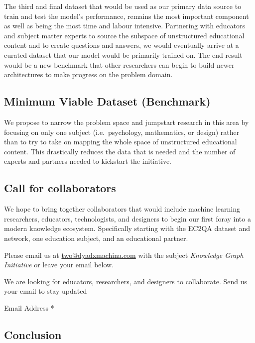 \documentclass{acm_proc_article-sp}
\begin{document}
The third and final dataset that would be used as our primary data
source to train and test the model's performance, remains the most
important component as well as being the most time and labour intensive.
Partnering with educators and subject matter experts to source the
subspace of unstructured educational content and to create questions and
answers, we would eventually arrive at a curated dataset that our model
would be primarily trained on. The end result would be a new benchmark
that other researchers can begin to build newer architectures to make
progress on the problem domain.

\subsection{Minimum Viable Dataset
(Benchmark)}\label{minimum-viable-dataset-benchmark}

We propose to narrow the problem space and jumpstart research in this
area by focusing on only one subject (i.e.~psychology, mathematics, or
design) rather than to try to take on mapping the whole space of
unstructured educational content. This drastically reduces the data that
is needed and the number of experts and partners needed to kickstart the
initiative.

\subsection{Call for collaborators}\label{call-for-collaborators}

We hope to bring together collaborators that would include machine
learning researchers, educators, technologists, and designers to begin
our first foray into a modern knowledge ecosystem. Specifically starting
with the EC2QA dataset and network, one education subject, and an
educational partner.

Please email us at \url{two@dyadxmachina.com} with the subject
\emph{Knowledge Graph Initiative} or leave your email below.

\hypertarget{mc_embed_signup}{}
\hypertarget{mc_embed_signup_scroll}{}
We are looking for educators, researchers, and designers to collaborate.
Send us your email to stay updated

Email Address *

\hypertarget{mce-responses}{}
\hypertarget{mce-error-response}{}

\hypertarget{mce-success-response}{}

\subsection{Conclusion}\label{conclusion}
\end{document}
